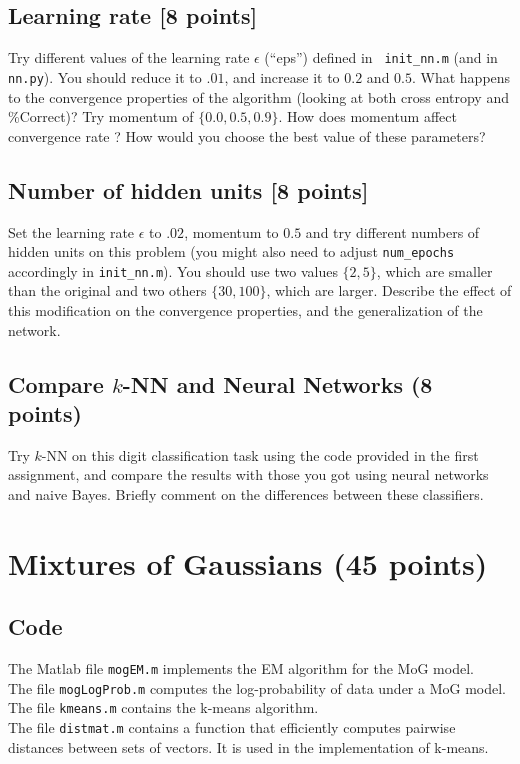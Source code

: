 \documentclass[12pt]{article}
\begin{document}
\subsection{Learning rate [8 points]}

Try different values of the learning rate $\epsilon$ (``eps'') defined in {\tt
init\_nn.m} (and in {\tt nn.py}). You should reduce it to $.01$, and increase it to $0.2$ and
$0.5$. What happens to the convergence properties of the algorithm (looking at
both cross entropy and \%Correct)? Try momentum of $\{0.0, 0.5, 0.9\}$. How does
momentum affect convergence rate ? How would you choose the best value of these
parameters?

\subsection{Number of hidden units [8 points]}

Set the learning rate $\epsilon$ to $.02$, momentum to $0.5$ and try different numbers of
hidden units on this problem (you might also need to adjust
\texttt{num\_epochs} accordingly in \texttt{init\_nn.m}). You should use two values $\{2, 5\}$, which are
smaller than the original and two others $\{30, 100\}$, which are larger.
Describe the effect of this modification on the convergence properties, and the
generalization of the network.

\subsection{Compare $k$-NN and Neural Networks (8 points)}

Try $k$-NN on this digit classification task using the code provided in the
first assignment, and compare the results with those you got using neural
networks and naive Bayes. Briefly comment on the differences between
these classifiers.



\section{Mixtures of Gaussians (45 points)}

\subsection{Code}

The Matlab file {\tt mogEM.m} implements the EM algorithm for the MoG model.\\
The file {\tt mogLogProb.m} computes the log-probability of data under a MoG model.\\
The file {\tt kmeans.m} contains the k-means algorithm.\\
The file {\tt distmat.m} contains a function that efficiently computes pairwise distances between
sets of vectors.  It is used in the implementation of k-means. \\
\end{document}
